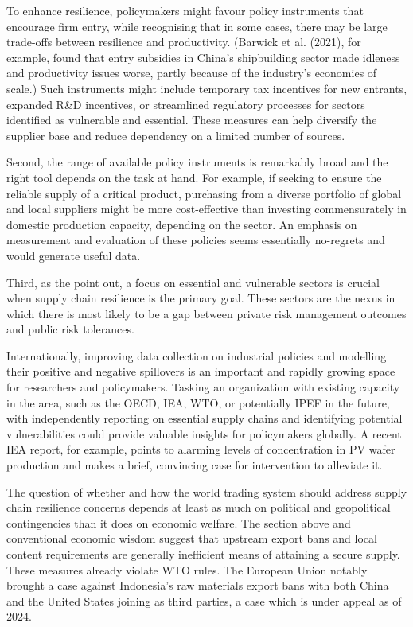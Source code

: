 \documentclass{article}
\begin{document}
To enhance resilience, policymakers might favour policy instruments that encourage firm entry, while recognising that in some cases, there may be large trade-offs between resilience and productivity. (Barwick et al. (2021), for example, found that entry subsidies in China's shipbuilding sector made idleness and productivity issues worse, partly because of the industry's economies of scale.) Such instruments might include temporary tax incentives for new entrants, expanded R\&D incentives, or streamlined regulatory processes for sectors identified as vulnerable and essential. These measures can help diversify the supplier base and reduce dependency on a limited number of sources.

Second, the range of available policy instruments is remarkably broad and the right tool depends on the task at hand. For example, if seeking to ensure the reliable supply of a critical product, purchasing from a diverse portfolio of global and local suppliers might be more cost-effective than investing commensurately in domestic production capacity, depending on the sector. An emphasis on measurement and evaluation of these policies seems essentially no-regrets and would generate useful data.

Third, as the \textcite{productivity_commission_vulnerable_2021} point out, a focus on essential and vulnerable sectors is crucial when supply chain resilience is the primary goal. These sectors are the nexus in which there is most likely to be a gap between private risk management outcomes and public risk tolerances.

Internationally, improving data collection on industrial policies and modelling their positive and negative spillovers is an important and rapidly growing space for researchers and policymakers. Tasking an organization with existing capacity in the area, such as the OECD, IEA, WTO, or potentially IPEF in the future, with independently reporting on essential supply chains and identifying potential vulnerabilities could provide valuable insights for policymakers globally. A recent IEA report, for example, points to alarming levels of concentration in PV wafer production and makes a brief, convincing case for intervention to alleviate it.

The question of whether and how the world trading system should address supply chain resilience concerns depends at least as much on political and geopolitical contingencies than it does on economic welfare. The section above and conventional economic wisdom suggest that upstream export bans and local content requirements are generally inefficient means of attaining a secure supply. These measures already violate WTO rules. The European Union notably brought a case against Indonesia's raw materials export bans with both China and the United States joining as third parties, a case which is under appeal as of 2024.
\end{document}
